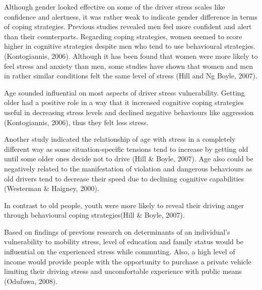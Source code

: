 \documentclass[
11pt, %
oneside, %
english, %
singlespacing, %
]{macthesis} %
\begin{document}
Although gender looked effective on some of the driver stress scales like confidence and alertness, it was rather weak to indicate gender difference in terms of coping strategies. Previous studies revealed men feel more confident and alert than their counterparts. Regarding coping strategies, women seemed to score higher in cognitive strategies despite men who tend to use behavioural strategies. (Kontogiannis, 2006). Although it has been found that women were more likely to feel stress and anxiety than men, some studies have shown that women and men in rather similar conditions felt the same level of stress (Hill and Ng Boyle, 2007).

Age sounded influential on most aspects of driver stress vulnerability. Getting older had a positive role in a way that it increased cognitive coping strategies useful in decreasing stress levels and declined negative behaviours like aggression (Kontogiannis, 2006), thus they felt less stress.

Another study indicated the relationship of age with stress in a completely different way as some situation-specific tensions tend to increase by getting old until some older ones decide not to drive (Hill \& Boyle, 2007). Age also could be negatively related to the manifestation of violation and dangerous behaviours as old drivers tend to decrease their speed due to declining cognitive capabilities (Westerman \& Haigney, 2000).

In contrast to old people, youth were more likely to reveal their driving anger through behavioural coping strategies(Hill \& Boyle, 2007).

Based on findings of previous research on determinants of an individual's vulnerability to mobility stress, level of education and family status would be influential on the experienced stress while commuting. Also, a high level of income would provide people with the opportunity to purchase a private vehicle limiting their driving stress and uncomfortable experience with public means (Odufuwa, 2008).
\end{document}
